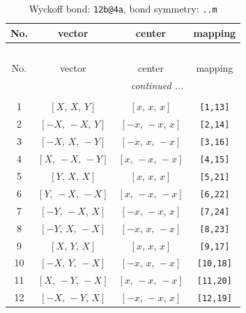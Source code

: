 \documentclass[fleqn,8pt]{jsarticle}
\begin{document}
\begin{longtable}{cccc}
\caption{Wyckoff bond: {\tt 12b@4a}, bond symmetry: {\tt ..m}}
 \\
 \hline \hline
No. & vector & center & mapping \\ \hline \endfirsthead

\multicolumn{3}{l}{\tablename\ \thetable{}} \\
 \hline \hline
No. & vector & center & mapping \\ \hline \endhead

 \hline \hline
\multicolumn{3}{r}{\footnotesize\it continued ...} \\ \endfoot

 \hline \hline
\multicolumn{3}{r}{} \\ \endlastfoot

1 & $\left[ X,\, X,\, Y \right]$ & $\left[ x,\, x,\, x \right]$ & {\tt [1,13]} \\ \hline
2 & $\left[ - X,\, - X,\, Y \right]$ & $\left[ - x,\, - x,\, x \right]$ & {\tt [2,14]} \\ \hline
3 & $\left[ - X,\, X,\, - Y \right]$ & $\left[ - x,\, x,\, - x \right]$ & {\tt [3,16]} \\ \hline
4 & $\left[ X,\, - X,\, - Y \right]$ & $\left[ x,\, - x,\, - x \right]$ & {\tt [4,15]} \\ \hline
5 & $\left[ Y,\, X,\, X \right]$ & $\left[ x,\, x,\, x \right]$ & {\tt [5,21]} \\ \hline
6 & $\left[ Y,\, - X,\, - X \right]$ & $\left[ x,\, - x,\, - x \right]$ & {\tt [6,22]} \\ \hline
7 & $\left[ - Y,\, - X,\, X \right]$ & $\left[ - x,\, - x,\, x \right]$ & {\tt [7,24]} \\ \hline
8 & $\left[ - Y,\, X,\, - X \right]$ & $\left[ - x,\, x,\, - x \right]$ & {\tt [8,23]} \\ \hline
9 & $\left[ X,\, Y,\, X \right]$ & $\left[ x,\, x,\, x \right]$ & {\tt [9,17]} \\ \hline
10 & $\left[ - X,\, Y,\, - X \right]$ & $\left[ - x,\, x,\, - x \right]$ & {\tt [10,18]} \\ \hline
11 & $\left[ X,\, - Y,\, - X \right]$ & $\left[ x,\, - x,\, - x \right]$ & {\tt [11,20]} \\ \hline
12 & $\left[ - X,\, - Y,\, X \right]$ & $\left[ - x,\, - x,\, x \right]$ & {\tt [12,19]} \\
\end{longtable}
\renewcommand{\arraystretch}{1.2}
\end{document}
